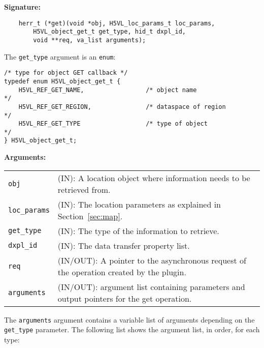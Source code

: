 \begin{mdframed}[style=bgbox]
\textbf{Signature:}
\begin{lstlisting}
    herr_t (*get)(void *obj, H5VL_loc_params_t loc_params, 
        H5VL_object_get_t get_type, hid_t dxpl_id, 
        void **req, va_list arguments);
\end{lstlisting}

The \texttt{get\_type} argument is an \texttt{enum}:
\begin{lstlisting}
/* type for object GET callback */
typedef enum H5VL_object_get_t {
    H5VL_REF_GET_NAME,                 /* object name                       */
    H5VL_REF_GET_REGION,               /* dataspace of region               */
    H5VL_REF_GET_TYPE                  /* type of object                    */
} H5VL_object_get_t;
\end{lstlisting}

\textbf{Arguments:}\\
\begin{tabular}{l p{13.5cm}}
  \texttt{obj} & (IN): A location object where information needs to be
  retrieved from.\\
  \texttt{loc\_params} & (IN): The location parameters as
  explained in Section~\ref{sec:map}.\\
  \texttt{get\_type} & (IN): The type of the information to retrieve.\\
  \texttt{dxpl\_id} & (IN): The data transfer property list.\\
  \texttt{req} & (IN/OUT): A pointer to the asynchronous request of the
  operation created by the plugin.\\
  \texttt{arguments} & (IN/OUT): argument list containing parameters and
  output pointers for the get operation. \\
\end{tabular}
\end{mdframed}

The \texttt{arguments} argument contains a variable list of arguments
depending on the \texttt{get\_type} parameter. The following list shows
the argument list, in order, for each type:

